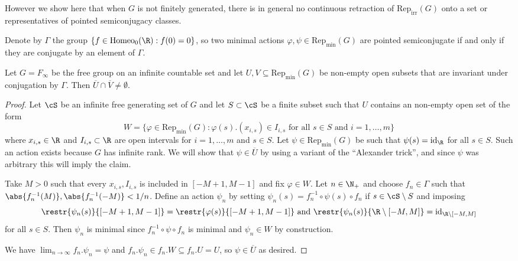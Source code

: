 \documentclass[reqno]{amsart}
\begin{document}
However we show here that when $G$ is not finitely generated, there is in general no {continuous} retraction of $\mathrm{Rep}_\mathrm{irr}(G)$ onto a set or representatives of pointed semiconjugacy classes. 



Denote by $\Gamma$ the group $\{f \in \mathrm{Homeo}_0(\R) : f(0) = 0\}$, so two minimal actions $\varphi, \psi \in \mathrm{Rep}_\mathrm{min}(G)$ are pointed semiconjugate if and only if they are conjugate by an element of $\Gamma$.
\begin{lema}\label{lema:Finfty}
Let $G = F_\infty$ be the free group on an infinite countable set and let $U,V \subseteq \mathrm{Rep}_\mathrm{min}(G)$ be non-empty open subsets that are invariant under conjugation by $\Gamma$. Then $\overline{U} \cap \overline{V} \neq \emptyset$.
\end{lema}
\begin{proof}
Let $\cS$ be an infinite free generating set of $G$ and let $S \subset \cS$ be a finite subset such that $U$ contains an non-empty open set of the form
\[
	W = \{ \varphi \in \mathrm{Rep}_\mathrm{min}(G) : \varphi(s).(x_{i,s}) \in I_{i,s} \text{ for all }s \in S \text{ and }i = 1,\ldots, m\}
\]
where $x_{i,s} \in \R$ and $I_{i,s} \subset \R$ are open intervals for $i = 1, \ldots, m$ and $s \in S$. Let $\psi \in \mathrm{Rep}_\mathrm{min}(G)$ be such that $\psi(s) = \mathrm{id}_\R$ for all $s \in S$. Such an action exists because $G$ has infinite rank. We will show that $\psi \in \overline{U}$ by using a variant of the ``Alexander trick'', and since $\psi$ was arbitrary this will imply the claim.

Take $M > 0$ such that every $x_{i,s}, I_{i,s}$ is included in $[-M + 1,M - 1]$ and fix $\varphi \in W$. Let $n \in \N_+$ and choose $f_n \in \Gamma$ such that $\abs{f_n^{-1}(M)}, \abs{f_n^{-1}(-M)} < 1/n$. Define an action $\psi_n$ by setting $\psi_n(s) = f_n^{-1} \circ \psi(s) \circ f_n$ if $s \in \cS \setminus S$ and imposing
\[
	\restr{\psi_n(s)}{[-M + 1, M-1]} = \restr{\varphi(s)}{[-M + 1,M - 1]} \text{ and } \restr{\psi_n(s)}{\R \setminus [-M, M]}  = \mathrm{id}_{\R \setminus [-M,M]}
\]
for all $s \in S$. Then $\psi_n$ is minimal since $f_n^{-1} \circ \psi \circ f_n$ is minimal and $\psi_n \in W$ by construction.

We have $\lim_{n \to \infty} f_n. \psi_n = \psi$ and $f_n. \psi_n \in f_n. W \subseteq f_n.U = U$, so $\psi \in \overline{U}$ as desired. \qedhere
\end{proof}
\end{document}
